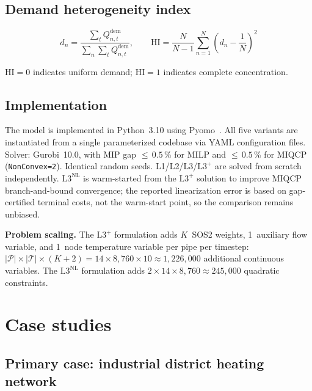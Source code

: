\documentclass[review,3p]{elsarticle}
\newcommand{\Lplus}{\mathrm{L3}^{+}}
\newcommand{\Lnl}{\mathrm{L3}^{\mathrm{NL}}}
\begin{document}
\subsection{Demand heterogeneity index}
\label{sec:model_hi}

\begin{equation}
  d_n = \frac{\sum_t Q_{n,t}^{\mathrm{dem}}}{\sum_n \sum_t
    Q_{n,t}^{\mathrm{dem}}},
  \qquad
  \mathrm{HI} = \frac{N}{N-1} \sum_{n=1}^{N}
    \left(d_n - \frac{1}{N}\right)^{\!2}
  \label{eq:hi}
\end{equation}

$\mathrm{HI} = 0$ indicates uniform demand;
$\mathrm{HI} = 1$ indicates complete concentration.

\subsection{Implementation}
\label{sec:model_impl}

The model is implemented in Python~3.10 using Pyomo~\cite{pyomo}.
All five variants are instantiated from a single parameterized
codebase via YAML configuration files. Solver: Gurobi~10.0, with MIP
gap ${\leq}\,0.5\,\%$ for MILP and ${\leq}\,0.5\,\%$ for MIQCP
(\texttt{NonConvex=2}). Identical random seeds.
L1/L2/L3/$\Lplus$ are solved from scratch independently.
$\Lnl$ is warm-started from the $\Lplus$ solution to improve
MIQCP branch-and-bound convergence; the reported linearization
error is based on gap-certified terminal costs, not the
warm-start point, so the comparison remains unbiased.

\textbf{Problem scaling.} The $\Lplus$ formulation adds $K$~SOS2
weights, 1~auxiliary flow variable, and 1~node temperature variable
per pipe per timestep:
$|\mathcal{P}| \times |\mathcal{T}| \times (K+2)
= 14 \times 8{,}760 \times 10 \approx 1{,}226{,}000$
additional continuous variables. The $\Lnl$ formulation adds
$2 \times 14 \times 8{,}760 \approx 245{,}000$ quadratic constraints.

\section{Case studies}
\label{sec:case_studies}

\subsection{Primary case: industrial district heating network}
\label{sec:case_stadtbach}
\end{document}
